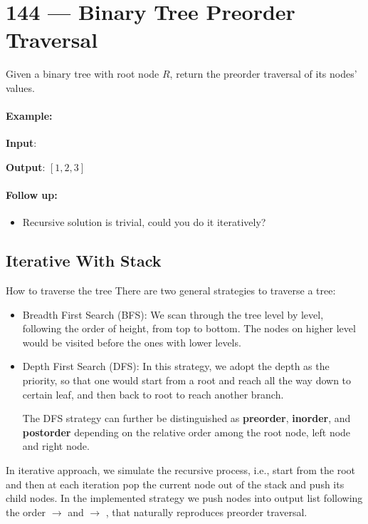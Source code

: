 \section{144 --- Binary Tree Preorder Traversal}
Given a binary tree with root node $R$, return the preorder traversal of its nodes' values.
\paragraph{Example:}
\begin{flushleft}
\textbf{Input}:
\begin{figure}[H]
\end{figure}
\textbf{Output}: $[1,2,3]$
\end{flushleft}
\paragraph{Follow up:}
\begin{itemize}
\item Recursive solution is trivial, could you do it iteratively?
\end{itemize}
\subsection{Iterative With Stack}
How to traverse the tree
There are two general strategies to traverse a tree:
\begin{itemize}
    \item Breadth First Search (BFS): We scan through the tree level by level, following the order of height, from top to bottom. The nodes on higher level would be visited before the ones with lower levels.
    \item Depth First Search (DFS): In this strategy, we adopt the depth as the priority, so that one would start from a root and reach all the way down to certain leaf, and then back to root to reach another branch.
    \par
    The DFS strategy can further be distinguished as \textbf{preorder}, \textbf{inorder}, and \textbf{postorder} depending on the relative order among the root node, left node and right node.
\end{itemize}
In iterative approach, we simulate the recursive process, i.e., start from the root and then at each iteration pop the current node out of the stack and push its child nodes. In the implemented strategy we push nodes into output list following the order  $\rightarrow$  and  $\rightarrow$ , that naturally reproduces preorder traversal.

